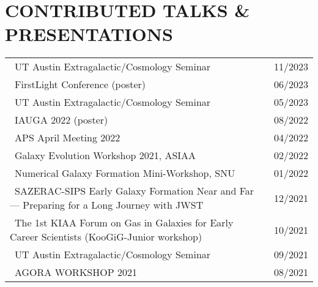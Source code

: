 \documentclass[letterpaper,10pt]{article}
\newcommand{\tabitem}{{\textbullet}~}
\begin{document}
\section{\textbf{CONTRIBUTED TALKS \& PRESENTATIONS}}
\begin{center}
\begin{tabularx}{0.97\textwidth}{l@{\extracolsep{\fill}}r}
  \tabitem UT Austin Extragalactic/Cosmology Seminar & 11/2023\\
  \tabitem FirstLight Conference (poster) & 06/2023\\
  \tabitem UT Austin Extragalactic/Cosmology Seminar & 05/2023\\
  \tabitem IAUGA 2022 (poster) & 08/2022\\
  \tabitem APS April Meeting 2022 & 04/2022\\
  \tabitem Galaxy Evolution Workshop 2021, ASIAA & 02/2022\\
  \tabitem Numerical Galaxy Formation Mini-Workshop, SNU & 01/2022\\
  \tabitem SAZERAC-SIPS Early Galaxy Formation Near and Far --- Preparing for a Long Journey with JWST & 12/2021\\
  \tabitem The 1st KIAA Forum on Gas in Galaxies for Early Career Scientists (KooGiG-Junior workshop) & 10/2021\\
  \tabitem UT Austin Extragalactic/Cosmology Seminar & 09/2021\\
  \tabitem AGORA WORKSHOP 2021 & 08/2021\\
\end{tabularx}
\end{center}


\end{document}
